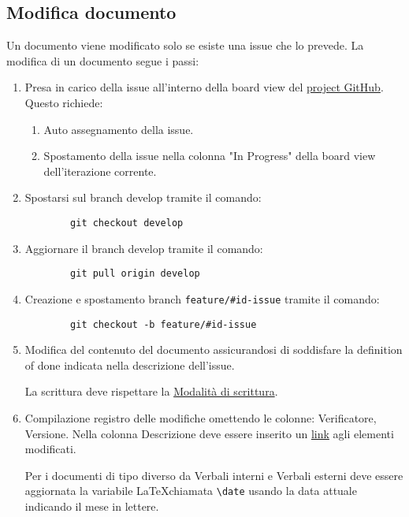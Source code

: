 \documentclass[a4paper, 12pt]{article}
\begin{document}
\subsection{Modifica documento}
\label{subsec:mod}
Un documento viene modificato solo se esiste una issue che lo prevede.
La modifica di un documento segue i passi:
\begin{enumerate}

    \item Presa in carico della issue all'interno della board view del \href{https://github.com/orgs/ALT-F4-eng/projects}{project GitHub}.
    Questo richiede:
    \begin{enumerate}
        \item Auto assegnamento della issue.
        \item Spostamento della issue nella colonna "In Progress" della board view dell'iterazione corrente.
    \end{enumerate}
    
    \item Spostarsi sul branch develop tramite il comando:
    \begin{lstlisting}
        git checkout develop
    \end{lstlisting}
     
    \item Aggiornare il branch develop tramite il comando: 
    \begin{lstlisting}
        git pull origin develop
    \end{lstlisting}
    
    \item Creazione e spostamento branch \lstinline|feature/#id-issue| tramite il comando:
    \begin{lstlisting}
        git checkout -b feature/#id-issue
    \end{lstlisting}
    

    \item Modifica del contenuto del documento assicurandosi di soddisfare la definition of done indicata nella descrizione dell'issue.
     
    La scrittura deve rispettare la \hyperref[subsec:mods]{Modalità di scrittura}. 

    \item Compilazione registro delle modifiche omettendo le colonne: Verificatore, Versione.
    Nella colonna Descrizione deve essere inserito un \hyperref[subsub:link]{link} agli elementi modificati.

    Per i documenti di tipo diverso da Verbali interni e Verbali esterni deve essere aggiornata la variabile \LaTeX \space chiamata \lstinline|\date| usando la data attuale indicando il mese in lettere. 
    

\end{enumerate}
\end{document}
